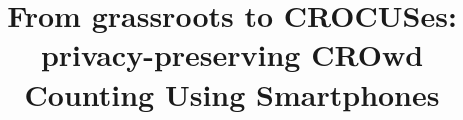 \documentclass[USenglish]{IEEEtran}
\begin{document}

\title{%
  From grassroots to CROCUSes: privacy-preserving CROwd Counting Using 
  Smartphones 
}


\end{document}
